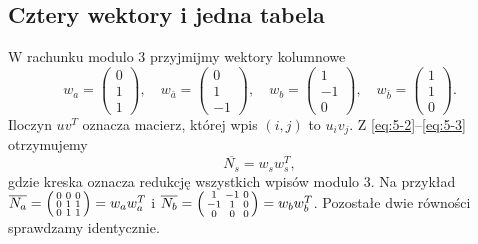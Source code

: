 \documentclass[11pt,a4paper]{article}
\numberwithin{equation}{section}
\theoremstyle{plain}
\theoremstyle{definition}
\theoremstyle{remark}
\begin{document}
\subsection{Cztery wektory i jedna tabela}
W rachunku modulo $3$ przyjmijmy wektory kolumnowe
\[
 w_a=\begin{pmatrix}0\\1\\1\end{pmatrix},\quad
 w_{\bar a}=\begin{pmatrix}0\\1\\-1\end{pmatrix},\quad
 w_b=\begin{pmatrix}1\\-1\\0\end{pmatrix},\quad
 w_{\bar b}=\begin{pmatrix}1\\1\\0\end{pmatrix}.
\]
Iloczyn $uv^T$ oznacza macierz, której wpis $(i,j)$ to $u_iv_j$. Z \eqref{eq:5-2}--\eqref{eq:5-3} otrzymujemy
\begin{equation}\label{eq:5-4}
 \overline{N_s}=w_sw_s^T,
\end{equation}
gdzie kreska oznacza redukcję wszystkich wpisów modulo $3$. Na przykład $\overline{N_a}=\begin{psmallmatrix}0&0&0\\0&1&1\\0&1&1\end{psmallmatrix}=w_aw_a^T$ i $\overline{N_b}=\begin{psmallmatrix}1&-1&0\\-1&1&0\\0&0&0\end{psmallmatrix}=w_bw_b^T$. Pozostałe dwie równości sprawdzamy identycznie.
\end{document}
